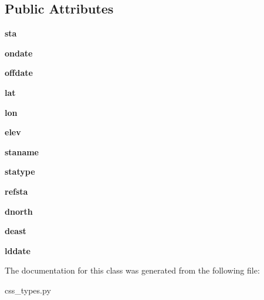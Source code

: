 \subsection*{Public Attributes}
\begin{DoxyCompactItemize}
\item 
\hypertarget{classcss__types_1_1site30_ac4fc589ad2a5291442a0d75b75d007eb}{}{\bfseries sta}\label{classcss__types_1_1site30_ac4fc589ad2a5291442a0d75b75d007eb}

\item 
\hypertarget{classcss__types_1_1site30_a49dbb4b22c9cce418e28b472973adfa3}{}{\bfseries ondate}\label{classcss__types_1_1site30_a49dbb4b22c9cce418e28b472973adfa3}

\item 
\hypertarget{classcss__types_1_1site30_a7c0eab3c2e946ccd9b37977d00140abe}{}{\bfseries offdate}\label{classcss__types_1_1site30_a7c0eab3c2e946ccd9b37977d00140abe}

\item 
\hypertarget{classcss__types_1_1site30_a94d4e14ca767d6714bc9f79335f0ffa0}{}{\bfseries lat}\label{classcss__types_1_1site30_a94d4e14ca767d6714bc9f79335f0ffa0}

\item 
\hypertarget{classcss__types_1_1site30_a4447a25fd5590ca761589111e9f40669}{}{\bfseries lon}\label{classcss__types_1_1site30_a4447a25fd5590ca761589111e9f40669}

\item 
\hypertarget{classcss__types_1_1site30_a8ab5c1594198e9a23c88f9c248137cb4}{}{\bfseries elev}\label{classcss__types_1_1site30_a8ab5c1594198e9a23c88f9c248137cb4}

\item 
\hypertarget{classcss__types_1_1site30_a5ebffdc617c32b5838b8ccd6d71d8b98}{}{\bfseries staname}\label{classcss__types_1_1site30_a5ebffdc617c32b5838b8ccd6d71d8b98}

\item 
\hypertarget{classcss__types_1_1site30_a8510ec111d917b6d8ab458ca9dd083d9}{}{\bfseries statype}\label{classcss__types_1_1site30_a8510ec111d917b6d8ab458ca9dd083d9}

\item 
\hypertarget{classcss__types_1_1site30_ae4b470be6fb9b629fd1434303575d0cd}{}{\bfseries refsta}\label{classcss__types_1_1site30_ae4b470be6fb9b629fd1434303575d0cd}

\item 
\hypertarget{classcss__types_1_1site30_af3670f28d73af28c38aeba341aa7687a}{}{\bfseries dnorth}\label{classcss__types_1_1site30_af3670f28d73af28c38aeba341aa7687a}

\item 
\hypertarget{classcss__types_1_1site30_aabc86593a0c310ff34c307f93af9af00}{}{\bfseries deast}\label{classcss__types_1_1site30_aabc86593a0c310ff34c307f93af9af00}

\item 
\hypertarget{classcss__types_1_1site30_abfde45643b31b706876a84bd5af30d52}{}{\bfseries lddate}\label{classcss__types_1_1site30_abfde45643b31b706876a84bd5af30d52}

\end{DoxyCompactItemize}


The documentation for this class was generated from the following file\+:\begin{DoxyCompactItemize}
\item 
css\+\_\+types.\+py\end{DoxyCompactItemize}
